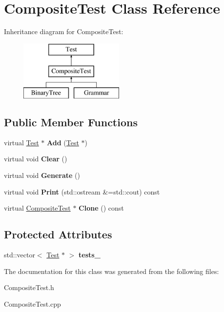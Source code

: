 \hypertarget{class_composite_test}{}\section{Composite\+Test Class Reference}
\label{class_composite_test}
Inheritance diagram for Composite\+Test\+:\begin{figure}[H]
\begin{center}
\leavevmode
\includegraphics[height=3.000000cm]{class_composite_test}
\end{center}
\end{figure}
\subsection*{Public Member Functions}
\begin{DoxyCompactItemize}
\item 
\mbox{\label{class_composite_test_ad0e6a5fd6360ce96743c636d717a233d}} 
virtual \hyperlink{class_test}{Test} $\ast$ {\bfseries Add} (\hyperlink{class_test}{Test} $\ast$)
\item 
\mbox{\label{class_composite_test_abfb08ce280fe059e6cf738ba0fadc9e3}} 
virtual void {\bfseries Clear} ()
\item 
\mbox{\label{class_composite_test_a09cc295cd80dc282b67dbdd4c6b61ae6}} 
virtual void {\bfseries Generate} ()
\item 
\mbox{\label{class_composite_test_a24dec1bf9fdb38b7d58c3a7049342db3}} 
virtual void {\bfseries Print} (std\+::ostream \&=std\+::cout) const
\item 
\mbox{\label{class_composite_test_aa145bb15f0f6b3a18ac6b1abf2e4e4b9}} 
virtual \hyperlink{class_composite_test}{Composite\+Test} $\ast$ {\bfseries Clone} () const
\end{DoxyCompactItemize}
\subsection*{Protected Attributes}
\begin{DoxyCompactItemize}
\item 
\mbox{\label{class_composite_test_a9c48b83daaec8de1a28aa813b7ee150e}} 
std\+::vector$<$ \hyperlink{class_test}{Test} $\ast$ $>$ {\bfseries tests\+\_\+}
\end{DoxyCompactItemize}


The documentation for this class was generated from the following files\+:\begin{DoxyCompactItemize}
\item 
Composite\+Test.\+h\item 
Composite\+Test.\+cpp\end{DoxyCompactItemize}
